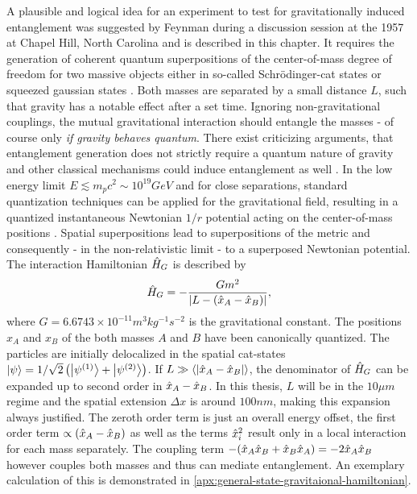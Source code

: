 A plausible and logical idea for an experiment to test for gravitationally induced entanglement was suggested by Feynman during a discussion session at the 1957  at Chapel Hill, North Carolina \cite[p. 247-260]{Rickles_2011} and is described in this chapter.
It requires the generation of coherent quantum superpositions of the center-of-mass degree of freedom for two massive objects either in so-called Schrödinger-cat states or squeezed gaussian states \cite{Bose_2017, Pedernales_2023,Krisnanda_2020}.
Both masses are separated by a small distance $L$, such that gravity has a notable effect after a set time.
Ignoring non-gravitational couplings, the mutual gravitational interaction should entangle the masses - of course only \textit{if gravity behaves quantum}.
There exist criticizing arguments, that entanglement generation does not strictly require a quantum nature of gravity and other classical mechanisms could induce entanglement as well \cite{Reginatto_2019}.
In the low energy limit $E\lesssim m_p c^2 \sim 10^{19}\si{GeV}$ and for close separations, standard quantization techniques can be applied for the gravitational field, resulting in a quantized instantaneous Newtonian $1/r$ potential acting on the center-of-mass positions \cite{Carney_2018,Pedernales_2023,Christodoulou_2022}.
Spatial superpositions lead to superpositions of the metric and consequently - in the non-relativistic limit - to a superposed Newtonian potential.
The interaction Hamiltonian $\hat{H}_G$ is described by
\begin{equation}\label{eq:2:gravity-hamiltonian}
  \hat{H}_G = - \frac{Gm^2}{\left\lvert L - (\hat{x}_A - \hat{x}_B)\right\rvert} ,
\end{equation}
where $G=6.6743 \times 10^{-11} \si{m^3 kg^{-1} s^{-2}}$ is the gravitational constant. 
The positions $x_A$ and $x_B$ of the both masses $A$ and $B$ have been canonically quantized. The particles are initially delocalized in the spatial cat-states $\ket{\psi} = 1/\sqrt{2}\left(\ket{\psi^{(1)}} + \ket{\psi^{(2)}}\right)$.
If $L \gg \left\langle\left\lvert\hat{x}_A - \hat{x}_B\right\rvert\right\rangle$, the denominator of $\hat{H}_G$ can be expanded up to second order in $\hat{x}_A - \hat{x}_B$. In this thesis, $L$ will be in the $10\si{\mu m}$ regime and the spatial extension $\Delta x$ is around $100\si{nm}$, making this expansion always justified.
The zeroth order term is just an overall energy offset, the first order term $\propto (\hat{x}_A - \hat{x}_B)$ as well as the terms $\hat{x}^2_i$ result only in a local interaction for each mass separately. The coupling term $ - (\hat{x}_A\hat{x}_B + \hat{x}_B\hat{x}_A) = -2\hat{x}_A\hat{x}_B$ however couples both masses and thus can mediate entanglement. An exemplary calculation of this is demonstrated in \cref{apx:general-state-gravitaional-hamiltonian}.

